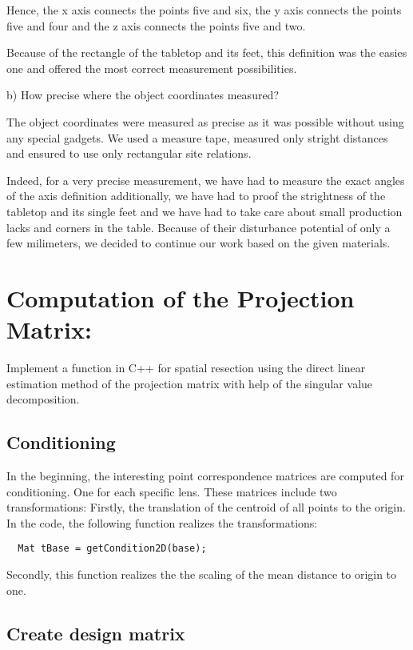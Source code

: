 \documentclass[a4paper,headings=small]{scrartcl}
\numberwithin{equation}{section} %
\numberwithin{figure}{section}   %
\begin{document}
Hence, the x axis connects the points five and six,
the y axis connects the points five and four and
the z axis connects the points five and two.

Because of the rectangle of the tabletop and its feet,
this definition was the easies one and offered the most correct measurement possibilities.

b) How precise where the object coordinates measured?

The object coordinates were measured as precise as it was possible
without using any special gadgets. We used a measure tape,
measured only stright distances and ensured to use only rectangular site relations.

Indeed, for a very precise measurement, we have had to measure the exact angles 
of the axis definition additionally, we have had to proof the strightness
of the tabletop and its single feet and we have had to take care about small
production lacks and corners in the table. 
Because of their disturbance potential of only a few milimeters,
we decided to continue our work based on the given materials.

\section{Computation of the Projection Matrix:}

Implement a function in C++ for spatial resection using the direct linear
estimation method of the projection matrix with help of the singular value
decomposition.

  \subsection{Conditioning}

  In the beginning, the interesting point correspondence matrices are computed for conditioning.
  One for each specific lens.
  These matrices include two transformations: 
  Firstly, the translation of the centroid of all points to the origin.
  In the code, the following function realizes the transformations:
  \begin{lstlisting}
  Mat tBase = getCondition2D(base);
  \end{lstlisting}
  Secondly, this function realizes the the scaling of the mean distance to origin to one.

  \subsection{Create design matrix}
\end{document}
